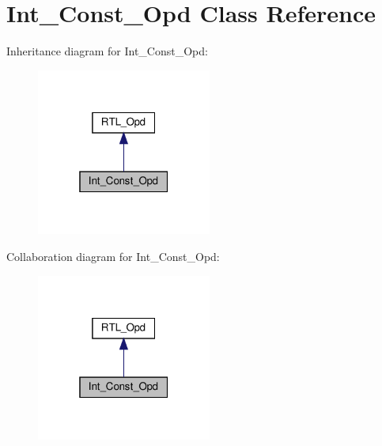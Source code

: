 \hypertarget{classInt__Const__Opd}{}\section{Int\+\_\+\+Const\+\_\+\+Opd Class Reference}
\label{classInt__Const__Opd}


Inheritance diagram for Int\+\_\+\+Const\+\_\+\+Opd\+:
\nopagebreak
\begin{figure}[H]
\begin{center}
\leavevmode
\includegraphics[width=163pt]{classInt__Const__Opd__inherit__graph}
\end{center}
\end{figure}


Collaboration diagram for Int\+\_\+\+Const\+\_\+\+Opd\+:
\nopagebreak
\begin{figure}[H]
\begin{center}
\leavevmode
\includegraphics[width=163pt]{classInt__Const__Opd__coll__graph}
\end{center}
\end{figure}
